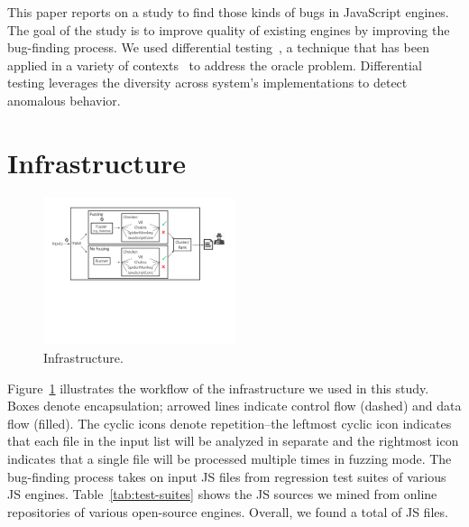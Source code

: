 \documentclass[10pt,conference,anonymous]{IEEEtran}
\begin{document}
This paper reports on a study to find those kinds of bugs in
JavaScript engines. The goal of the study is to improve quality of
existing \js{} engines by improving the bug-finding process. We used
differential testing~\cite{Brumley-etal-ss07}, a technique that has
been applied in a variety of
contexts~\cite{Yang-etal-pldi11,Chen-etal-fse2015,Argyros-etla-ccs16,Chen-etal-pldi16,petsios-etal-sp2017,SivakornAPKJ17}
to address the oracle problem. Differential testing leverages the
diversity across system's implementations to detect anomalous
behavior. 

\section{Infrastructure}
\label{sec:design}


\begin{figure}[t]
  \centering
  \includegraphics[trim=0 250 0 0,clip,width=0.5\textwidth]{google-awards-workflow}  
  \caption{\label{fig:workflow}Infrastructure.}
\end{figure}

Figure~\ref{fig:workflow} illustrates the workflow of the
infrastructure we used in this study. Boxes denote encapsulation;
arrowed lines indicate control flow (dashed) and data flow
(filled). The cyclic icons denote repetition--the leftmost cyclic icon
indicates that each file in the input list will be analyzed in
separate and the rightmost icon indicates that a single file will be
processed multiple times in fuzzing mode. The bug-finding process
takes on input JS files from regression test suites of various JS
engines. Table~\ref{tab:test-suites} shows the JS sources we mined
from online repositories of various open-source engines. Overall, we
found a total of  JS files.
\end{document}
